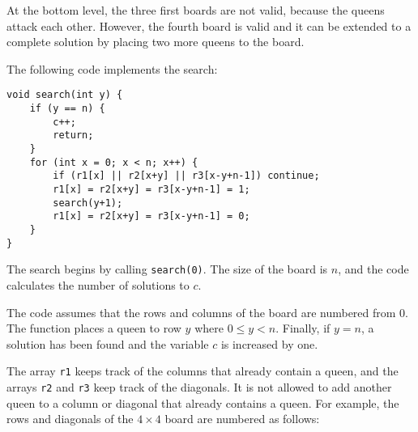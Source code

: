 At the bottom level, the three first boards
are not valid, because the queens attack each other.
However, the fourth board is valid
and it can be extended to a complete solution by
placing two more queens to the board.

\begin{samepage}
The following code implements the search:
\begin{lstlisting}
void search(int y) {
    if (y == n) {
        c++;
        return;
    }
    for (int x = 0; x < n; x++) {
        if (r1[x] || r2[x+y] || r3[x-y+n-1]) continue;
        r1[x] = r2[x+y] = r3[x-y+n-1] = 1;
        search(y+1);
        r1[x] = r2[x+y] = r3[x-y+n-1] = 0;
    }
}
\end{lstlisting}
\end{samepage}
The search begins by calling \texttt{search(0)}.
The size of the board is $n$,
and the code calculates the number of solutions
to $c$.

The code assumes that the rows and columns
of the board are numbered from 0.
The function places a queen to row $y$
where $0 \le y < n$.
Finally, if $y=n$, a solution has been found
and the variable $c$ is increased by one.

The array \texttt{r1} keeps track of the columns
that already contain a queen,
and the arrays \texttt{r2} and \texttt{r3}
keep track of the diagonals.
It is not allowed to add another queen to a
column or diagonal that already contains a queen. 
For example, the rows and diagonals of
the $4 \times 4$ board are numbered as follows:

